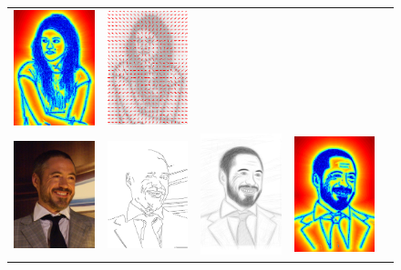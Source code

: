 \begin{figure}
\begin{tabular}{ccccc}
\includegraphics[width=1in]   {figures/imagetable/mag_ks.png} &
\includegraphics[width=1in]     {figures/imagetable/dir_ks.png} \\
\includegraphics[width=1in]{figures/imagetable/image_rd.png} &
\includegraphics[width=1in]{figures/imagetable/edges_rd.png} &
\includegraphics[width=1in]    {figures/imagetable/avg_rd.png} &
\includegraphics[width=1in]   {figures/imagetable/mag_rd.png} &

\end{tabular}
\end{figure}
